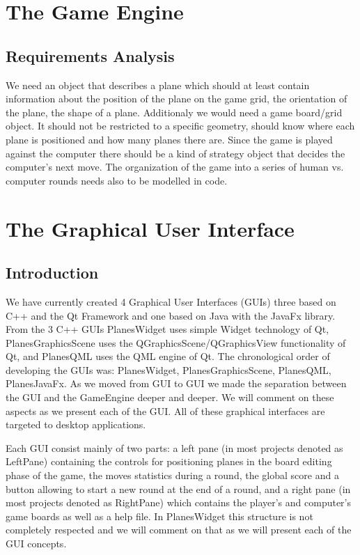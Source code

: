 \documentclass{report}
\begin{document}
\chapter {The Game Engine }
\section{Requirements Analysis}
We need an object that describes a plane which should at least contain information about the position of the plane on the game grid, the orientation of the plane, the shape of a plane. Additionaly we would need a game board/grid object. It should not be restricted to a specific geometry, should know where each plane is positioned and how many planes there are. Since the game is played against the computer there should be a kind of strategy object that decides the computer's next move. The organization of the game into a series of human vs. computer rounds needs also to be modelled in code.







\chapter {The Graphical User Interface}

\section{Introduction}

We have currently created 4 Graphical User Interfaces (GUIs) three based on C++ and the Qt Framework and one based on Java with the JavaFx library. From the 3 C++ GUIs PlanesWidget uses simple Widget technology of Qt, PlanesGraphicsScene uses the QGraphicsScene/QGraphicsView functionality of Qt, and PlanesQML uses the QML engine of Qt. The chronological order of developing the GUIs was: PlanesWidget, PlanesGraphicsScene, PlanesQML, PlanesJavaFx. As we moved from GUI to GUI we made the separation between the GUI and the GameEngine deeper and deeper. We will comment on these aspects as we present each of the GUI. All of these graphical interfaces are targeted to desktop applications.

Each GUI consist mainly of two parts: a left pane (in most projects denoted as LeftPane) containing the controls for positioning planes in the board editing phase of the game, the moves statistics during a round, the global score and a button allowing to start a new round at the end of a round, and a right pane (in most projects denoted as RightPane) which contains the player's and computer's game boards as well as a help file. In PlanesWidget this structure is not completely respected and we will comment on that as we will present each of the GUI concepts.





\end{document}
